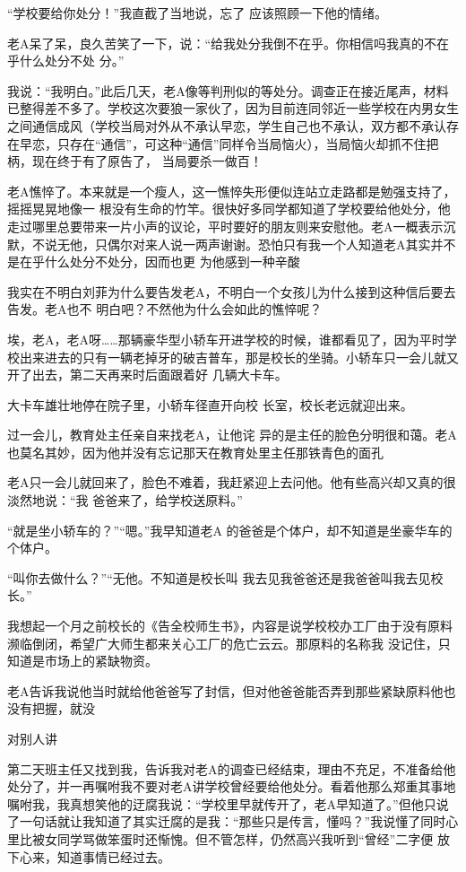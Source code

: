 \documentclass{article}
\begin{document}
“学校要给你处分！”我直截了当地说，忘了
应该照顾一下他的情绪。 

老A呆了呆，良久苦笑了一下，说：“给我处分我倒不在乎。你相信吗我真的不在乎什么处分不处
分。” 

我说：“我明白。”此后几天，老A像等判刑似的等处分。调查正在接近尾声，材料已整得差不多了。学校这次要狼一家伙了，因为目前连同邻近一些学校在内男女生之间通信成风（学校当局对外从不承认早恋，学生自己也不承认，双方都不承认存在早恋，只存在“通信”，可这种“通信”同样令当局恼火），当局恼火却抓不住把柄，现在终于有了原告了，
当局要杀一做百！ 

老A憔悴了。本来就是一个瘦人，这一憔悴失形便似连站立走路都是勉强支持了，摇摇晃晃地像一
\newpage
根没有生命的竹竿。很快好多同学都知道了学校要给他处分，他走过哪里总要带来一片小声的议论，平时要好的朋友则来安慰他。老A一概表示沉默，不说无他，只偶尔对来人说一两声谢谢。恐怕只有我一个人知道老A其实并不是在乎什么处分不处分，因而也更
为他感到一种辛酸 

我实在不明白刘菲为什么要告发老A，不明白一个女孩儿为什么接到这种信后要去告发。老A也不
明白吧？不然他为什么会如此的憔悴呢？ 

埃，老A，老A呀……那辆豪华型小轿车开进学校的时候，谁都看见了，因为平时学校出来进去的只有一辆老掉牙的破吉普车，那是校长的坐骑。小轿车只一会儿就又开了出去，第二天再来时后面跟着好
几辆大卡车。 

大卡车雄壮地停在院子里，小轿车径直开向校
长室，校长老远就迎出来。 

过一会儿，教育处主任亲自来找老A，让他诧
\newpage
异的是主任的脸色分明很和蔼。老A也莫名其妙，因为他并没有忘记那天在教育处里主任那铁青色的面孔

老A只一会儿就回来了，脸色不难着，我赶紧迎上去问他。他有些高兴却又真的很淡然地说：“我
爸爸来了，给学校送原料。” 

“就是坐小轿车的？”“嗯。”我早知道老A
的爸爸是个体户，却不知道是坐豪华车的个体户。 

“叫你去做什么？”“无他。不知道是校长叫
我去见我爸爸还是我爸爸叫我去见校长。” 

我想起一个月之前校长的《告全校师生书》，内容是说学校校办工厂由于没有原料濒临倒闭，希望广大师生都来关心工厂的危亡云云。那原料的名称我
没记住，只知道是市场上的紧缺物资。 

老A告诉我说他当时就给他爸爸写了封信，但对他爸爸能否弄到那些紧缺原料他也没有把握，就没

\newpage
对别人讲 

第二天班主任又找到我，告诉我对老A的调查已经结束，理由不充足，不准备给他处分了，并一再嘱咐我不要对老A讲学校曾经要给他处分。看着他那么郑重其事地嘱咐我，我真想笑他的迂腐我说：“学校里早就传开了，老A早知道了。”但他只说了一句话就让我知道了其实迁腐的是我：“那些只是传言，懂吗？”我说懂了同时心里比被女同学骂做笨蛋时还惭愧。但不管怎样，仍然高兴我听到“曾经”二字便
放下心来，知道事情已经过去。 
\end{document}
